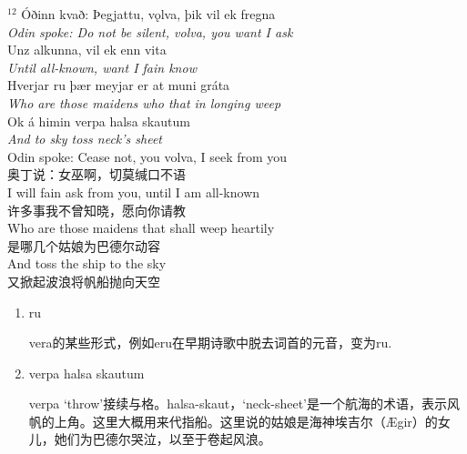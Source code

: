 \begin{paracol}{2}
  \noindent
  $^{12}$ Óðinn kvað: Þegjattu, vǫlva, þik vil ek fregna\\
  \textit{Odin spoke: Do not be silent, volva, you want I ask}\\
  Unz alkunna, vil ek enn vita\\
  \textit{Until all-known, want I fain know}\\
  Hverjar ru þær meyjar er at muni gráta\\
  \textit{Who are those maidens who that in longing weep}\\
  Ok á himin verpa halsa skautum\\
  \textit{And to sky toss neck's sheet}\\
  \switchcolumn
  \noindent
  Odin spoke: Cease not, you volva, I seek from you\\
  奥丁说：女巫啊，切莫缄口不语\\
  I will fain ask from you, until I am all-known\\
  许多事我不曾知晓，愿向你请教\\
  Who are those maidens that shall weep heartily\\
  是哪几个姑娘为巴德尔动容\\
  And toss the ship to the sky\\
  又掀起波浪将帆船抛向天空

\end{paracol}
\begin{grammar*}{}
  \begin{enumerate}[leftmargin=*]
    \item ru

          vera的某些形式，例如eru在早期诗歌中脱去词首的元音，变为ru.

    \item verpa halsa skautum

          verpa `throw'接续与格。halsa-skaut，`neck-sheet'是一个航海的术语，表示风帆的上角。这里大概用来代指船。这里说的姑娘是海神埃吉尔（Ægir）的女儿，她们为巴德尔哭泣，以至于卷起风浪。
  \end{enumerate}
\end{grammar*}


